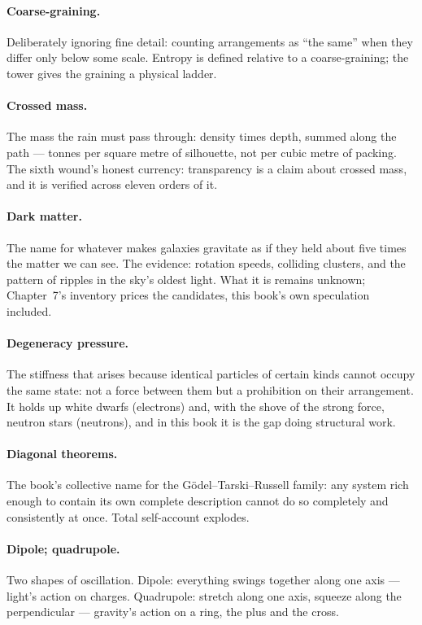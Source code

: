 \documentclass[fontsize=11pt,paper=a4,pagesize=auto,parskip=half-]{scrbook}
\begin{document}
\paragraph{Coarse-graining.} Deliberately ignoring fine detail: counting arrangements as ``the same'' when they differ only below some scale. Entropy is defined relative to a coarse-graining; the tower gives the graining a physical ladder.

\paragraph{Crossed mass.} The mass the rain must pass through: density times depth, summed along the path --- tonnes per square metre of silhouette, not per cubic metre of packing. The sixth wound's honest currency: transparency is a claim about crossed mass, and it is verified across eleven orders of it.

\paragraph{Dark matter.} The name for whatever makes galaxies gravitate as if they held about five times the matter we can see. The evidence: rotation speeds, colliding clusters, and the pattern of ripples in the sky's oldest light. What it is remains unknown; Chapter~7's inventory prices the candidates, this book's own speculation included.

\paragraph{Degeneracy pressure.} The stiffness that arises because identical particles of certain kinds cannot occupy the same state: not a force between them but a prohibition on their arrangement. It holds up white dwarfs (electrons) and, with the shove of the strong force, neutron stars (neutrons), and in this book it is the gap doing structural work.

\paragraph{Diagonal theorems.} The book's collective name for the G\"odel--Tarski--Russell family: any system rich enough to contain its own complete description cannot do so completely and consistently at once. Total self-account explodes.

\paragraph{Dipole; quadrupole.} Two shapes of oscillation. Dipole: everything swings together along one axis --- light's action on charges. Quadrupole: stretch along one axis, squeeze along the perpendicular --- gravity's action on a ring, the plus and the cross.
\end{document}

